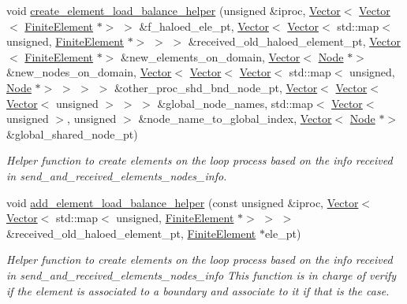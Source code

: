 \begin{DoxyCompactItemize}
void \hyperlink{classoomph_1_1RefineableTriangleMesh_a27d0ec7e44fc3adebf78d5e581d79e6d}{create\+\_\+element\+\_\+load\+\_\+balance\+\_\+helper} (unsigned \&iproc, \hyperlink{classoomph_1_1Vector}{Vector}$<$ \hyperlink{classoomph_1_1Vector}{Vector}$<$ \hyperlink{classoomph_1_1FiniteElement}{Finite\+Element} $\ast$$>$ $>$ \&f\+\_\+haloed\+\_\+ele\+\_\+pt, \hyperlink{classoomph_1_1Vector}{Vector}$<$ \hyperlink{classoomph_1_1Vector}{Vector}$<$ std\+::map$<$ unsigned, \hyperlink{classoomph_1_1FiniteElement}{Finite\+Element} $\ast$$>$ $>$ $>$ \&received\+\_\+old\+\_\+haloed\+\_\+element\+\_\+pt, \hyperlink{classoomph_1_1Vector}{Vector}$<$ \hyperlink{classoomph_1_1FiniteElement}{Finite\+Element} $\ast$$>$ \&new\+\_\+elements\+\_\+on\+\_\+domain, \hyperlink{classoomph_1_1Vector}{Vector}$<$ \hyperlink{classoomph_1_1Node}{Node} $\ast$$>$ \&new\+\_\+nodes\+\_\+on\+\_\+domain, \hyperlink{classoomph_1_1Vector}{Vector}$<$ \hyperlink{classoomph_1_1Vector}{Vector}$<$ \hyperlink{classoomph_1_1Vector}{Vector}$<$ std\+::map$<$ unsigned, \hyperlink{classoomph_1_1Node}{Node} $\ast$$>$ $>$ $>$ $>$ \&other\+\_\+proc\+\_\+shd\+\_\+bnd\+\_\+node\+\_\+pt, \hyperlink{classoomph_1_1Vector}{Vector}$<$ \hyperlink{classoomph_1_1Vector}{Vector}$<$ \hyperlink{classoomph_1_1Vector}{Vector}$<$ unsigned $>$ $>$ $>$ \&global\+\_\+node\+\_\+names, std\+::map$<$ \hyperlink{classoomph_1_1Vector}{Vector}$<$ unsigned $>$, unsigned $>$ \&node\+\_\+name\+\_\+to\+\_\+global\+\_\+index, \hyperlink{classoomph_1_1Vector}{Vector}$<$ \hyperlink{classoomph_1_1Node}{Node} $\ast$$>$ \&global\+\_\+shared\+\_\+node\+\_\+pt)
\begin{DoxyCompactList}\small\item\em Helper function to create elements on the loop process based on the info received in send\+\_\+and\+\_\+received\+\_\+elements\+\_\+nodes\+\_\+info. \end{DoxyCompactList}\item 
void \hyperlink{classoomph_1_1RefineableTriangleMesh_aaab12a2182859c1a8f4ece3752116944}{add\+\_\+element\+\_\+load\+\_\+balance\+\_\+helper} (const unsigned \&iproc, \hyperlink{classoomph_1_1Vector}{Vector}$<$ \hyperlink{classoomph_1_1Vector}{Vector}$<$ std\+::map$<$ unsigned, \hyperlink{classoomph_1_1FiniteElement}{Finite\+Element} $\ast$$>$ $>$ $>$ \&received\+\_\+old\+\_\+haloed\+\_\+element\+\_\+pt, \hyperlink{classoomph_1_1FiniteElement}{Finite\+Element} $\ast$ele\+\_\+pt)
\begin{DoxyCompactList}\small\item\em Helper function to create elements on the loop process based on the info received in send\+\_\+and\+\_\+received\+\_\+elements\+\_\+nodes\+\_\+info This function is in charge of verify if the element is associated to a boundary and associate to it if that is the case. \end{DoxyCompactList}\item 
$$
\end{DoxyCompactItemize}
